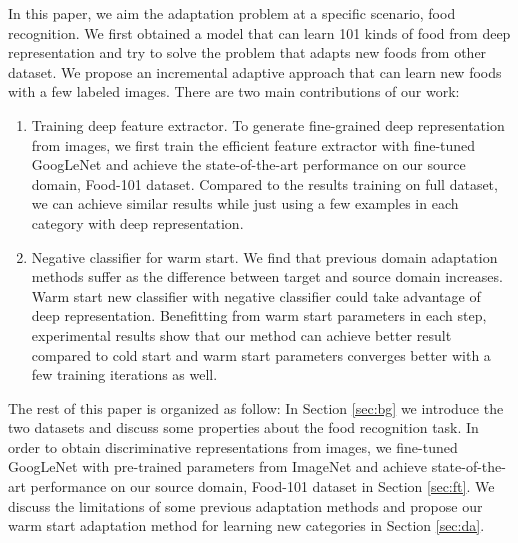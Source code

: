 In this paper, we aim the adaptation problem at a specific scenario, food recognition. We first obtained a model that can learn 101 kinds of food from deep representation and try to solve the problem that adapts new foods from other dataset. We propose an incremental adaptive approach that can learn new foods with a few labeled images. There are two main contributions of our work:
\begin{enumerate}
  \item Training deep feature extractor. To generate fine-grained deep representation from images, we first train the efficient feature extractor with fine-tuned GoogLeNet and achieve the state-of-the-art performance on our source domain, Food-101 dataset. Compared to the results training on full dataset, we can achieve similar results while just using a few examples in each category with deep representation.
  \item Negative classifier for warm start. We find that previous domain adaptation methods suffer as the difference between target and source domain increases. Warm start new classifier with negative classifier could take advantage of deep representation. Benefitting from warm start parameters in each step, experimental results show that our method can achieve better result compared to cold start and warm start parameters converges better with a few training iterations as well.
\end{enumerate}

The rest of this paper is organized as follow: In Section \ref{sec:bg} we introduce the two datasets and discuss some properties about the food recognition task. In order to obtain discriminative representations from images, we fine-tuned GoogLeNet with pre-trained parameters from ImageNet and achieve state-of-the-art performance on our source domain, Food-101 dataset in Section \ref{sec:ft}. We discuss the limitations of some previous adaptation methods and propose our warm start adaptation method for learning new categories in Section \ref{sec:da}.
